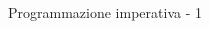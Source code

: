 \begin{frame}{Programmazione imperativa - 1}
\begin{columns}
\begin{column}{0.5\textwidth}
\begin{figure}
			\end{figure}

		\end{column}
	\end{columns}

\end{frame}
